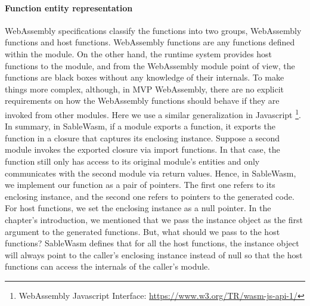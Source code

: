 \paragraph{Function entity representation}
WebAssembly specifications classify the functions into two groups, WebAssembly functions and host functions. WebAssembly functions are any functions defined within the module. On the other hand, the runtime system provides host functions to the module, and from the WebAssembly module point of view, the functions are black boxes without any knowledge of their internals. To make things more complex, although, in MVP WebAssembly, there are no explicit requirements on how the WebAssembly functions should behave if they are invoked from other modules. Here we use a similar generalization in Javascript \footnote{WebAssembly Javascript Interface: \url{https://www.w3.org/TR/wasm-js-api-1/}}. In summary, in SableWasm, if a module exports a function, it exports the function in a closure that captures its enclosing instance. Suppose a second module invokes the exported closure via import functions. In that case, the function still only has access to its original module's entities and only communicates with the second module via return values. Hence, in SableWasm, we implement our function as a pair of pointers. The first one refers to its enclosing instance, and the second one refers to pointers to the generated code. For host functions, we set the enclosing instance as a null pointer. In the chapter's introduction, we mentioned that we pass the instance object as the first argument to the generated functions. But, what should we pass to the host functions? SableWasm defines that for all the host functions, the instance object will always point to the caller's enclosing instance instead of null so that the host functions can access the internals of the caller's module.

